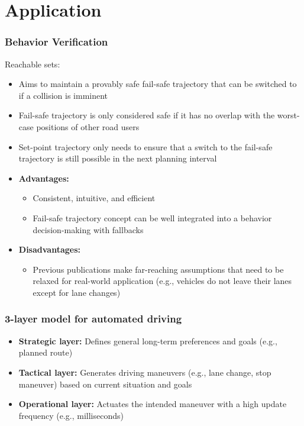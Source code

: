 \section{Application}

\subsubsection*{Behavior Verification}

Reachable sets:
\begin{itemize}
  \item Aims to maintain a provably safe fail-safe trajectory that can be switched to if a collision is imminent
  \item Fail-safe trajectory is only considered safe if it has no overlap with the worst-case positions of other road users
  \item Set-point trajectory only needs to ensure that a switch to the fail-safe trajectory is still possible in the next planning interval
  \item \textbf{Advantages:}
        \begin{itemize}
            \item Consistent, intuitive, and efficient
            \item Fail-safe trajectory concept can be well integrated into a behavior decision-making with fallbacks
        \end{itemize}
  \item \textbf{Disadvantages:}
        \begin{itemize}
            \item Previous publications make far-reaching assumptions that need to be relaxed for real-world application (e.g., vehicles do not leave their lanes except for lane changes)
        \end{itemize}
\end{itemize}

\subsubsection*{3-layer model for automated driving}
\begin{itemize}
    \item \textbf{Strategic layer:} Defines general long-term preferences and goals (e.g., planned route)
    \item \textbf{Tactical layer:} Generates driving maneuvers (e.g., lane change, stop maneuver) based on current situation and goals
    \item \textbf{Operational layer:} Actuates the intended maneuver with a high update frequency (e.g., milliseconds)
\end{itemize}

